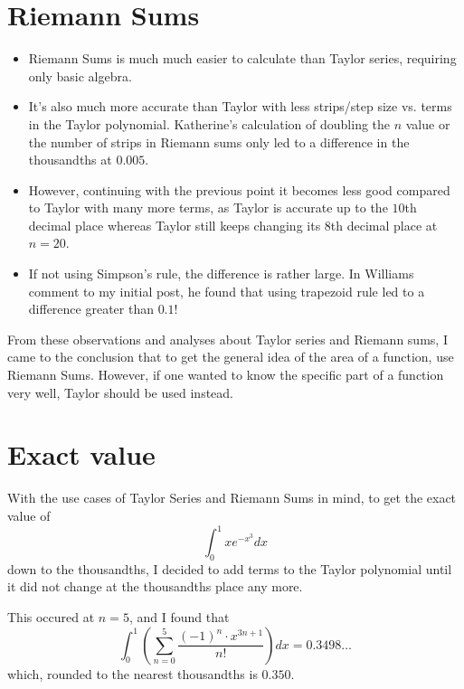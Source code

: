 \documentclass[12pt]{article}
\begin{document}
\section{Riemann Sums}
\begin{itemize}
  \item Riemann Sums is much much easier to calculate than Taylor series, requiring only basic algebra.
  \item It's also much more accurate than Taylor with less strips/step size vs. terms in the Taylor polynomial. Katherine's calculation of doubling the $n$ value or the number of strips in Riemann sums only led to a difference in the thousandths at $0.005$.
  \item However, continuing with the previous point it becomes less good compared to Taylor with many more terms, as Taylor is accurate up to the $10$th decimal place whereas Taylor still keeps changing its $8$th decimal place at $n=20$.
  \item If not using Simpson's rule, the difference is rather large. In Williams comment to my initial post, he found that using trapezoid rule led to a difference greater than $0.1$!
\end{itemize}

From these observations and analyses about Taylor series and Riemann sums, I came to the conclusion that to get the general idea of the area of a function, use Riemann Sums. However, if one wanted to know the specific part of a function very well, Taylor should be used instead.

\section{Exact value}
With the use cases of Taylor Series and Riemann Sums in mind, to get the exact value of
$$
  \int_{0}^{1}xe^{-x^{3}}dx
$$
down to the thousandths, I decided to add terms to the Taylor polynomial until it did not change at the thousandths place any more.

This occured at $n=5$, and I found that
$$
  \int_{0}^{1}\left(\sum_{n=0}^{5}\frac{\left(-1\right)^{n}\cdot x^{3n+1}}{n!}\right)dx = 0.3498\ldots
$$
which, rounded to the nearest thousandths is $\boxed{0.350}$.
\end{document}
